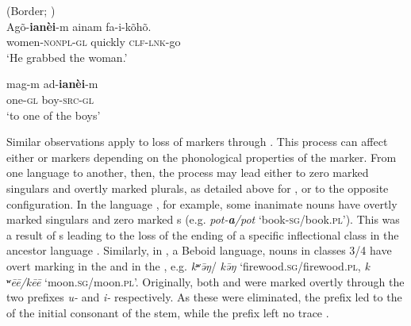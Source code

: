 \documentclass[output=paper]{langsci/langscibook}
\begin{document}
\ea\label{imonda2}
 (Border; )\\
\ea
\gll Agõ-\textbf{{ianèi}}-m ainam fa-i-kõhõ.\\
women-\textsc{nonpl-gl} quickly \textsc{clf-lnk}-go\\
\glt `He grabbed the woman.' 

\ex
\gll mag-m ad-\textbf{{ianèi}}-m \\
one-\textsc{gl} boy-\textsc{src-gl} \\
\glt `to one of the boys'


\z
\z


Similar observations apply to loss of  markers through . This process can affect
either  or  markers depending on the phonological
properties of the marker. From one language to another, then, the process may lead either to zero marked singulars and
overtly marked plurals, as detailed above for
, or to the opposite configuration. In the
 language ,  for example, some inanimate nouns have
overtly marked singulars and
zero marked s
 (e.g. {\em pot-\textbf{\textit {a}}/pot} `book-\textsc{sg}/book.\textsc{pl}'). This was a result of
 s leading to the loss of the  ending of a specific inflectional class in the ancestor language
 \citep[250--256]{NitzNordhoff2010}. Similarly, in , a Beboid
 language, nouns in classes 3/4 have overt
  marking in the  and  in the , e.g. {\em
    k{\bf ʷ}\=əŋ}/{\em
    k\=əŋ} `firewood.\textsc{sg}/firewood.\textsc{pl}, {\em k{\bf
      ʷ}ēē/kēē} `moon.\textsc{sg}/moon.\textsc{pl}'.
  Originally, both  and  were marked overtly through the
  two prefixes {\em *u-} and {\em *i-} respectively. As these were
  eliminated, the  prefix led to the  of the
  initial consonant of the stem, while the  prefix left no trace
  \citep{Hombert1980}.
\end{document}
